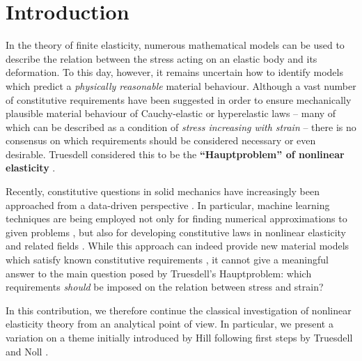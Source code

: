 \documentclass[10pt]{article}
\numberwithin{theoremCounter}{section}
\theoremstyle{plain}
\theoremstyle{definition}
\numberwithin{equation}{section}
\begin{document}
\section{Introduction}
%
In the theory of finite elasticity, numerous mathematical models can be used to describe the relation between the stress acting on an elastic body and its deformation. To this day, however, it remains uncertain how to identify models which predict a \emph{physically reasonable} material behaviour.
Although a vast number of constitutive requirements have been suggested in order to ensure mechanically plausible material behaviour of Cauchy-elastic or hyperelastic laws \cite{hill1968constitutivea,hill1968constitutiveb,hill1970constitutive,nefftranslationbecker} -- many of which can be described as a condition of \emph{stress increasing with strain} -- there is no consensus on which requirements should be considered necessary or even desirable. Truesdell considered this to be the \textbf{\enquote{Hauptproblem} of nonlinear elasticity} \cite{truesdell1956ungeloste}.

Recently, constitutive questions in solid mechanics have increasingly been approached from a data-driven perspective \cite{jin2023recent}. In particular, machine learning techniques are being employed not only for finding numerical approximations to given problems \cite{lagaris1998artificial,raissi2019physics,agn_voss2021morrey2,jin2023recent}, but also for developing constitutive laws in nonlinear elasticity and related fields \cite{flaschel2021unsupervised,thakolkaran2022nn,agn_klein2021neural,flaschel2023automated,tacc2024benchmarking,linka2023new,klein2024}. While this approach can indeed provide new material models which satisfy known constitutive requirements \cite{agn_klein2021neural,klein2024}, it cannot give a meaningful answer to the main question posed by Truesdell's Hauptproblem: which requirements \emph{should} be imposed on the relation between stress and strain?

In this contribution, we therefore continue the classical investigation of nonlinear elasticity theory from an analytical point of view. In particular, we present
a variation on a theme initially introduced by Hill \cite{hill1968constitutivea,hill1968constitutiveb, hill1978} following first steps by Truesdell \cite{truesdell55hypo} and Noll \cite{Noll55}.
\end{document}
